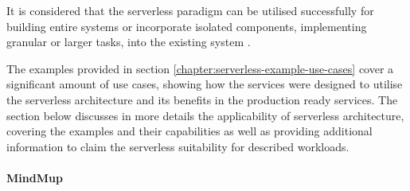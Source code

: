 It is considered that the serverless paradigm can be utilised successfully for building entire systems or incorporate isolated components, implementing granular or larger tasks, into the existing system \cite{ServerlessArchitectureOnAWS}.

The examples provided in section \ref{chapter:serverless-example-use-cases} cover a significant amount of use cases, showing how the services were designed to utilise the serverless architecture and its benefits in the production ready services. The section below discusses in more details the applicability of serverless architecture, covering the examples and their capabilities as well as providing additional information to claim the serverless suitability for described workloads.





\paragraph{MindMup} \label{chapter:serverless-suitability-mindmup}

